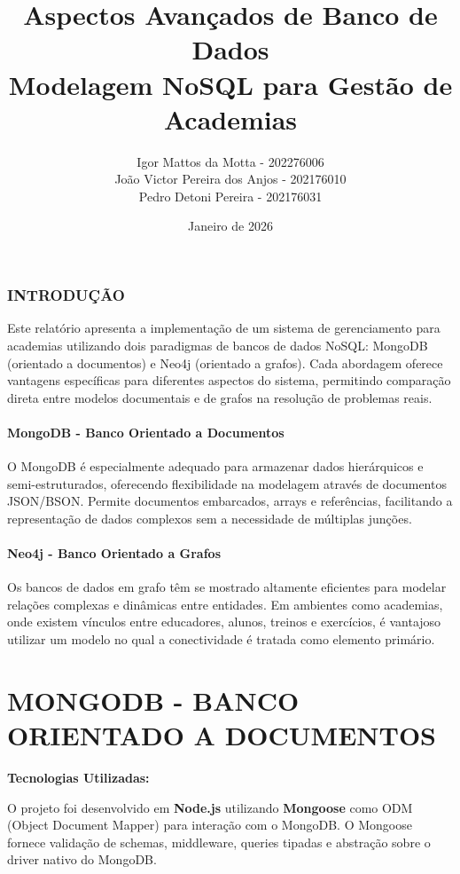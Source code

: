 \documentclass[12pt,a4paper]{article}
\title{Aspectos Avançados de Banco de Dados\\Modelagem NoSQL para Gestão de Academias}
\author{
Igor Mattos da Motta - 202276006 \\ João Victor Pereira dos Anjos - 202176010 \\Pedro Detoni Pereira - 202176031
}
\date{Janeiro de 2026}
\begin{document}
\maketitle
\tableofcontents
\newpage

\section{INTRODUÇÃO}

Este relatório apresenta a implementação de um sistema de gerenciamento para academias utilizando dois paradigmas de bancos de dados NoSQL: MongoDB (orientado a documentos) e Neo4j (orientado a grafos). Cada abordagem oferece vantagens específicas para diferentes aspectos do sistema, permitindo comparação direta entre modelos documentais e de grafos na resolução de problemas reais.

\subsection{MongoDB - Banco Orientado a Documentos}

O MongoDB é especialmente adequado para armazenar dados hierárquicos e semi-estruturados, oferecendo flexibilidade na modelagem através de documentos JSON/BSON. Permite documentos embarcados, arrays e referências, facilitando a representação de dados complexos sem a necessidade de múltiplas junções.

\subsection{Neo4j - Banco Orientado a Grafos}

Os bancos de dados em grafo têm se mostrado altamente eficientes para modelar relações complexas e dinâmicas entre entidades. Em ambientes como academias, onde existem vínculos entre educadores, alunos, treinos e exercícios, é vantajoso utilizar um modelo no qual a conectividade é tratada como elemento primário.

\part{MONGODB - BANCO ORIENTADO A DOCUMENTOS}

\textbf{Tecnologias Utilizadas:}

O projeto foi desenvolvido em \textbf{Node.js} utilizando \textbf{Mongoose} como ODM (Object Document Mapper) para interação com o MongoDB. O Mongoose fornece validação de schemas, middleware, queries tipadas e abstração sobre o driver nativo do MongoDB.
\end{document}
